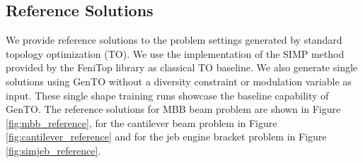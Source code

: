 \begin{table}[!ht]
    \centering
\end{table}


\subsection{Reference Solutions} \label{subsec:ref_solutions}
We provide reference solutions to the problem settings generated by standard topology optimization (TO). We use the implementation of the SIMP method provided by the FeniTop library \cite{fenitop} as classical TO baseline. \newline
We also generate single solutions using GenTO without a diversity constraint or modulation variable as input. These single shape training runs showcase the baseline capability of GenTO. \newline
The reference solutions for MBB beam problem are shown in Figure \ref{fig:mbb_reference}, for the cantilever beam problem in Figure \ref{fig:cantilever_reference} and for the jeb engine bracket problem in Figure \ref{fig:simjeb_reference}.

